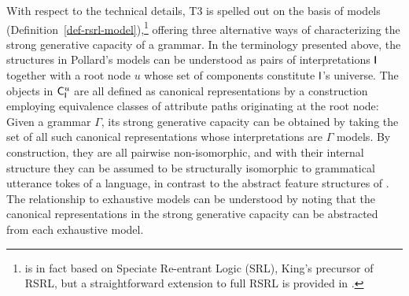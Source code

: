 \documentclass[output=paper
                ,modfonts
                ,nonflat
	        ,collection
	        ,collectionchapter
	        ,collectiontoclongg
 	        ,biblatex
                ,babelshorthands
                ,newtxmath
                ,draftmode
                ,colorlinks, citecolor=brown
]{./langsci/langscibook}
\begin{document}
{With respect to the technical details, T3 is spelled out on the basis of
models (Definition~\ref{def-rsrl-model}),\footnote{\cite{Pollard99a} is in
  fact based on Speciate Re-entrant Logic (SRL),
  King's precursor of RSRL, but a straightforward extension to full
  RSRL is provided in \cite{Richter2004a-u}.} offering three
alternative ways of characterizing the strong generative capacity of a
grammar. In the terminology presented above, the structures in
Pollard's models can be understood as pairs of interpretations $\mathsf{I}$
together with a root node $u$ whose set of components constitute
$\mathsf{I}$'s universe. The objects in $\mathsf{C}_{\mathsf{I}}^u$ are all defined
as canonical representations by a construction employing equivalence
classes of attribute paths originating at the root node: Given a
grammar $\Gamma$, its strong generative capacity can be obtained by taking
the set of all such canonical representations whose interpretations are
$\Gamma$ models. By construction, they are all pairwise non-isomorphic,
and with their internal structure they can be assumed to be structurally
isomorphic to grammatical utterance tokes of a language, in contrast to
the abstract feature structures of \cite{PollardSag1994}. The relationship
to exhaustive models can be understood by noting that the canonical
representations in the strong generative capacity can be abstracted from
each exhaustive model.

}
\end{document}
